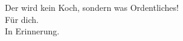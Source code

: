 
\null\vfill
\begin{center}
 \glqq Der wird kein Koch, sondern was Ordentliches!\grqq \\
 Für dich. \\
 In Erinnerung.
\end{center}
\vfill

\cleardoublepage

